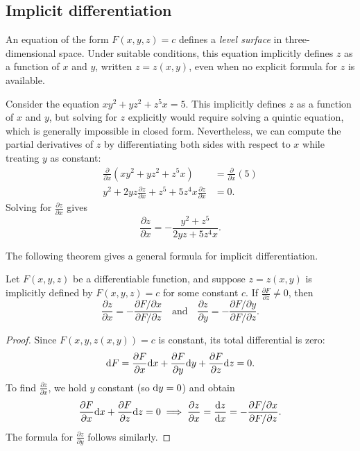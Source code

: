 \documentclass[a4paper]{article}
\begin{document}
\subsection{Implicit differentiation}
An equation of the form $F(x, y, z) = c$ defines a \emph{level surface} in three-dimensional space. Under suitable conditions, this equation implicitly defines $z$ as a function of $x$ and $y$, written $z = z(x, y)$, even when no explicit formula for $z$ is available.

\begin{eg}
  Consider the equation $xy^2 + yz^2 + z^5x = 5$. This implicitly defines $z$ as a function of $x$ and $y$, but solving for $z$ explicitly would require solving a quintic equation, which is generally impossible in closed form. Nevertheless, we can compute the partial derivatives of $z$ by differentiating both sides with respect to $x$ while treating $y$ as constant:
  \begin{align*}
    \frac{\partial}{\partial x}(xy^2 + yz^2 + z^5x) &= \frac{\partial}{\partial x}(5)\\
    y^2 + 2yz\frac{\partial z}{\partial x} + z^5 + 5z^4x\frac{\partial z}{\partial x} &= 0.
  \end{align*}
  Solving for $\frac{\partial z}{\partial x}$ gives
  \[
    \frac{\partial z}{\partial x} = -\frac{y^2 + z^5}{2yz + 5z^4x}.
  \]
\end{eg}

The following theorem gives a general formula for implicit differentiation.

\begin{thm}
  Let $F(x, y, z)$ be a differentiable function, and suppose $z = z(x, y)$ is implicitly defined by $F(x, y, z) = c$ for some constant $c$. If $\frac{\partial F}{\partial z} \neq 0$, then
  \[
    \frac{\partial z}{\partial x} = -\frac{\partial F/\partial x}{\partial F/\partial z} \quad \text{and} \quad \frac{\partial z}{\partial y} = -\frac{\partial F/\partial y}{\partial F/\partial z}.
  \]
\end{thm}

\begin{proof}
  Since $F(x, y, z(x,y)) = c$ is constant, its total differential is zero:
  \[
    \mathrm{d} F = \frac{\partial F}{\partial x}\mathrm{d} x + \frac{\partial F}{\partial y}\mathrm{d} y + \frac{\partial F}{\partial z}\mathrm{d} z = 0.
  \]
  To find $\frac{\partial z}{\partial x}$, we hold $y$ constant (so $\mathrm{d} y = 0$) and obtain
  \[
    \frac{\partial F}{\partial x}\mathrm{d} x + \frac{\partial F}{\partial z}\mathrm{d} z = 0 \implies \frac{\partial z}{\partial x} = \frac{\mathrm{d} z}{\mathrm{d} x} = -\frac{\partial F/\partial x}{\partial F/\partial z}.
  \]
  The formula for $\frac{\partial z}{\partial y}$ follows similarly.
\end{proof}
\end{document}
